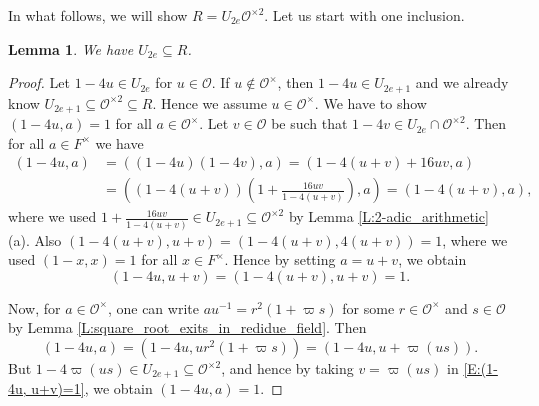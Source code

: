 \documentclass[10pt, letterpaper]{amsart}
\theoremstyle{plain}
\newtheorem{Lem}[equation]{Lemma}
\theoremstyle{definition}
\numberwithin{equation}{section}
\newcommand{\Ocal}{\mathcal{O}}
\begin{document}
In what follows, we will show $R=U_{2e}\Ocal^{\times 2}$. Let us start with one inclusion.
\begin{Lem}
We have $U_{2e}\subseteq R$.
\end{Lem}
\begin{proof}
Let $1-4u\in U_{2e}$ for $u\in\Ocal$. If $u\notin\Ocal^\times$, then $1-4u\in U_{2e+1}$ and we already know $U_{2e+1}\subseteq\Ocal^{\times 2}\subseteq R$. Hence we assume $u\in\Ocal^\times$. We have to show $(1-4u, a)=1$ for all $a\in\Ocal^\times$. Let $v\in\Ocal$ be such that $1-4v\in U_{2e}\cap\Ocal^{\times 2}$. Then for all $a\in F^\times$ we have
\begin{align*}
(1-4u, a)&=((1-4u)(1-4v), a)=(1-4(u+v)+16uv,a)\\
&=((1-4(u+v))(1+\frac{16uv}{1-4(u+v)}),a)=(1-4(u+v),a),
\end{align*}
where we used $1+\frac{16uv}{1-4(u+v)}\in U_{2e+1}\subseteq \Ocal^{\times 2}$ by Lemma \ref{L:2-adic_arithmetic} (a). Also $(1-4(u+v), u+v)=(1-4(u+v), 4(u+v))=1$, where we used $(1-x, x)=1$ for all $x\in F^\times$. Hence by setting $a=u+v$, we obtain
\begin{equation}\label{E:(1-4u, u+v)=1}
(1-4u, u+v)=(1-4(u+v),u+v)=1.
\end{equation}

Now, for $a\in\Ocal^\times$, one can write $au^{-1}=r^2(1+\varpi s)$ for some $r\in\Ocal^\times$ and $s\in\Ocal$ by Lemma \ref{L:square_root_exits_in_redidue_field}. Then
\[
(1-4u, a)=(1-4u, ur^2(1+\varpi s))=(1-4u, u+\varpi(us)).
\]
But $1-4\varpi(us)\in U_{2e+1}\subseteq\Ocal^{\times 2}$, and hence by taking $v=\varpi(us)$ in \eqref{E:(1-4u, u+v)=1}, we obtain $(1-4u, a)=1$.
\end{proof}
\end{document}
